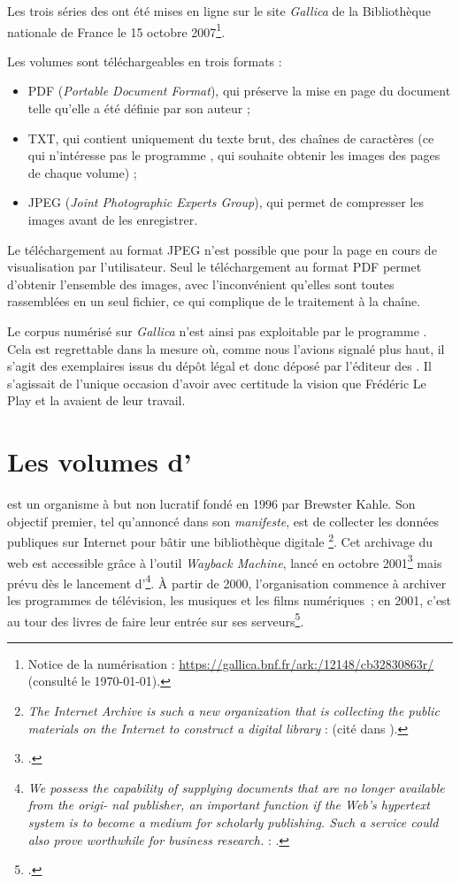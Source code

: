 Les trois séries des \odm{} ont été mises en ligne sur le site \textit{Gallica} de la Bibliothèque nationale de France le 15 octobre 2007\footnote{Notice de la numérisation : \url{https://gallica.bnf.fr/ark:/12148/cb32830863r/} (consulté le \today).}.

Les volumes sont téléchargeables en trois formats :

\begin{itemize}
    \item PDF (\textit{Portable Document Format}), qui préserve la mise en page du document telle qu'elle a été définie par son auteur ;
    \item TXT, qui contient uniquement du texte brut, \cad{} des chaînes de caractères (ce qui n'intéresse pas le programme \timeus, qui souhaite obtenir les images des pages de chaque volume) ;
    \item JPEG (\textit{Joint Photographic Experts Group}), qui permet de compresser les images avant de les enregistrer.
\end{itemize}

Le téléchargement au format JPEG n'est possible que pour la page en cours de visualisation par l'utilisateur. Seul le téléchargement au format PDF permet d'obtenir l'ensemble des images, avec l'inconvénient qu'elles sont toutes rassemblées en un seul fichier, ce qui complique de le traitement à la chaîne.

Le corpus numérisé sur \textit{Gallica} n'est ainsi pas exploitable par le programme \timeus. Cela est regrettable dans la mesure où, comme nous l'avions signalé plus haut, il s'agit des exemplaires issus du dépôt légal et donc déposé par l'éditeur des \odm. Il s'agissait de l'unique occasion d'avoir avec certitude la vision que Frédéric Le Play et la \sess{} avaient de leur travail.

\section{Les volumes d'\ia}

\ia{} est un organisme à but non lucratif fondé en 1996 par Brewster Kahle. Son objectif premier, tel qu'annoncé dans son \textit{manifeste}, est de \og collecter les données publiques sur Internet pour bâtir une bibliothèque digitale \fg{}\footnote{\og \textit{The Internet Archive is such a new organization that is collecting the public materials on the Internet to construct a digital library} \fg{} : \cite{Brewster1} (cité dans \cite{Brewster2}).}. Cet archivage du web est accessible grâce à l'outil \textit{Wayback Machine}, lancé en octobre 2001\footcite[p.344]{panos} mais prévu dès le lancement d'\ia\footnote{\textit{We possess the capability of supplying documents that are no longer available from the origi- nal publisher, an important function if the Web’s hypertext system is to become a medium for scholarly publishing. Such a service could also prove worthwhile for business research.} : \cite[p.83]{iamanifest}.}. À partir de 2000, l'organisation commence à archiver les programmes de télévision, les musiques et les films numériques~; en 2001, c'est au tour des livres de faire leur entrée sur ses serveurs\footcite[p. 3-4]{Brewster2}.

